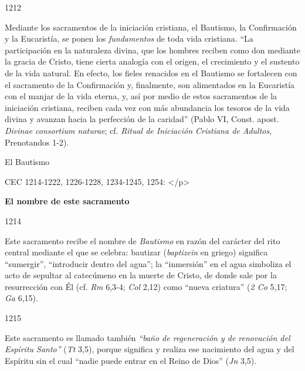 			\begin{ccebody}\begin{ccenumber}1212\end{ccenumber} Mediante los sacramentos de la iniciación cristiana, el Bautismo, la Confirmación y la Eucaristía, se ponen los \textit{fundamentos} de toda vida cristiana. “La participación en la naturaleza divina, que los hombres reciben como don mediante la gracia de Cristo, tiene cierta analogía con el origen, el crecimiento y el sustento de la vida natural. En efecto, los fieles renacidos en el Bautismo se fortalecen con el sacramento de la Confirmación y, finalmente, son alimentados en la Eucaristía con el manjar de la vida eterna, y, así por medio de estos sacramentos de la iniciación cristiana, reciben cada vez con más abundancia los tesoros de la vida divina y avanzan hacia la perfección de la caridad” (Pablo VI, Const. apost. \textit{Divinae consortium naturae}; cf. \textit{Ritual de Iniciación Cristiana de Adultos}, Prenotandos 1-2).\end{ccebody}
			
			\begin{ccetheme}El Bautismo \end{ccetheme}
			
			\begin{ccereference}\end{ccereference}CEC 1214-1222, 1226-1228, 1234-1245, 1254: </p>
			
			\begin{ccebody}\textbf{El nombre de este sacramento}\end{ccebody}
			
			\begin{ccebody}\begin{ccenumber}1214\end{ccenumber} Este sacramento recibe el nombre de \textit{Bautismo} en razón del carácter del rito central mediante el que se celebra: bautizar (\textit{baptizein} en griego) significa “sumergir”, “introducir dentro del agua”; la “inmersión” en el agua simboliza el acto de sepultar al catecúmeno en la muerte de Cristo, de donde sale por la resurrección con Él (cf. \textit{Rm} 6,3-4; \textit{Col }2,12) como “nueva criatura” (\textit{2 Co} 5,17; \textit{Ga} 6,15).\end{ccebody}
			
			\begin{ccebody}\begin{ccenumber}1215\end{ccenumber} Este sacramento es llamado también \textit{“baño de regeneración y de renovación del Espíritu Santo”} (\textit{Tt} 3,5), porque significa y realiza ese nacimiento del agua y del Espíritu sin el cual “nadie puede entrar en el Reino de Dios” (\textit{Jn} 3,5).\end{ccebody}
			
